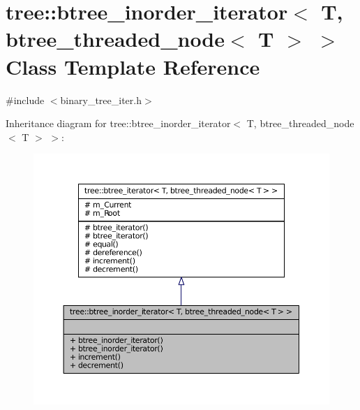 \hypertarget{classtree_1_1btree__inorder__iterator_3_01T_00_01btree__threaded__node_3_01T_01_4_01_4}{\section{tree\-:\-:btree\-\_\-inorder\-\_\-iterator$<$ \-T, btree\-\_\-threaded\-\_\-node$<$ \-T $>$ $>$ \-Class \-Template \-Reference}
\label{classtree_1_1btree__inorder__iterator_3_01T_00_01btree__threaded__node_3_01T_01_4_01_4}
}


{\ttfamily \#include $<$binary\-\_\-tree\-\_\-iter.\-h$>$}



\-Inheritance diagram for tree\-:\-:btree\-\_\-inorder\-\_\-iterator$<$ \-T, btree\-\_\-threaded\-\_\-node$<$ \-T $>$ $>$\-:
\nopagebreak
\begin{figure}[H]
\begin{center}
\leavevmode
\includegraphics[width=350pt]{classtree_1_1btree__inorder__iterator_3_01T_00_01btree__threaded__node_3_01T_01_4_01_4__inherit__graph}
\end{center}
\end{figure}


